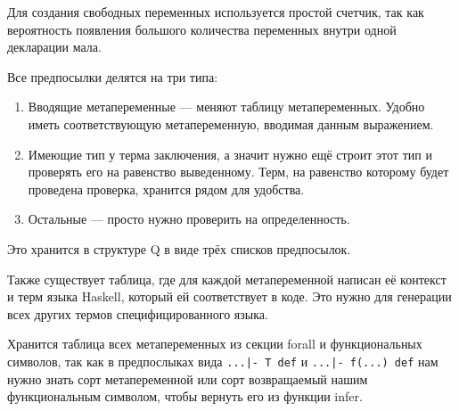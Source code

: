 Для создания свободных переменных используется простой счетчик, так как вероятность появления большого количества переменных внутри одной декларации мала.

Все предпосылки делятся на три типа:
\begin{enumerate}
  \item Вводящие метапеременные --- меняют таблицу метапеременных. Удобно иметь соответствующую метапеременную, вводимая данным выражением.
  \item Имеющие тип у терма заключения, а значит нужно ещё строит этот тип и проверять его на равенство выведенному. Терм, на равенство которому будет проведена проверка, хранится рядом для удобства.
  \item Остальные --- просто нужно проверить на определенность.
\end{enumerate}

Это хранится в структуре Q в виде трёх списков предпосылок.

Также существует таблица, где для каждой метапеременной написан её контекст и терм языка Haskell, который ей соответствует в коде. Это нужно для генерации всех других термов специфицированного языка.

Хранится таблица всех метапеременных из секции forall и функциональных символов, так как в предпослыках вида \lstinline{...|- T def} и \lstinline{...|- f(...) def} нам нужно знать сорт метапеременной или сорт возвращаемый нашим функциональным символом, чтобы вернуть его из функции infer.



























